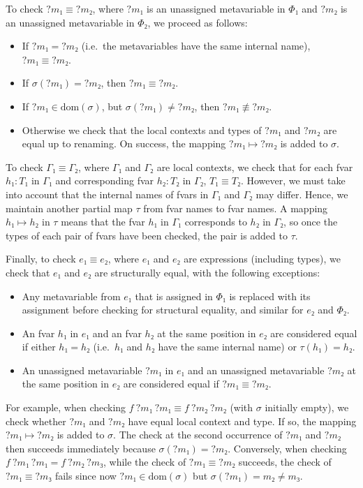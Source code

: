\documentclass[sigplan,10pt,anonymous,review]{acmart}
\newcommand{\mvar}[1]{{?#1}}
\newcommand{\dom}{\ensuremath{\mathrm{dom}}}
\begin{document}
To check $\mvar{m₁} ≡ \mvar{m₂}$, where $\mvar{m₁}$ is an unassigned metavariable in $Φ₁$ and $\mvar{m₂}$ is an unassigned metavariable in $Φ₂$, we proceed as follows:
\begin{itemize}
  \item If $\mvar{m₁} = \mvar{m₂}$ (i.e.\ the metavariables have the same internal name), $\mvar{m₁} ≡ \mvar{m₂}$.
  \item If $σ(\mvar{m₁}) = \mvar{m₂}$, then $\mvar{m₁} ≡ \mvar{m₂}$.
  \item If $\mvar{m₁} ∈ \dom(σ)$, but $σ(\mvar{m₁}) ≠ \mvar{m₂}$, then $\mvar{m₁} ≢ \mvar{m₂}$.
  \item Otherwise we check that the local contexts and types of $\mvar{m₁}$ and $\mvar{m₂}$ are equal up to renaming.
        On success, the mapping $\mvar{m₁} ↦ \mvar{m₂}$ is added to $σ$.
\end{itemize}

To check $Γ₁ ≡ Γ₂$, where $Γ₁$ and $Γ₂$ are local contexts, we check that for each fvar $h₁ : T₁$ in $Γ₁$ and corresponding fvar $h₂ : T₂$ in $Γ₂$, $T₁ ≡ T₂$.
However, we must take into account that the internal names of fvars in $Γ₁$ and $Γ₂$ may differ.
Hence, we maintain another partial map $τ$ from fvar names to fvar names.
A mapping $h₁ ↦ h₂$ in $τ$ means that the fvar $h₁$ in $Γ₁$ corresponds to $h₂$ in $Γ₂$, so once the types of each pair of fvars have been checked, the pair is added to $τ$.

Finally, to check $e₁ ≡ e₂$, where $e₁$ and $e₂$ are expressions (including types), we check that $e₁$ and $e₂$ are structurally equal, with the following exceptions:
\begin{itemize}
  \item Any metavariable from $e₁$ that is assigned in $Φ₁$ is replaced with its assignment before checking for structural equality, and similar for $e₂$ and $Φ₂$.
  \item An fvar $h₁$ in $e₁$ and an fvar $h₂$ at the same position in $e₂$ are considered equal if either $h₁ = h₂$ (i.e.\ $h₁$ and $h₂$ have the same internal name) or $τ(h₁) = h₂$.
  \item An unassigned metavariable $\mvar{m₁}$ in $e₁$ and an unassigned metavariable $\mvar{m₂}$ at the same position in $e₂$ are considered equal if $\mvar{m₁} ≡ \mvar{m₂}$.
\end{itemize}

For example, when checking $f~\mvar{m₁}~\mvar{m₁} ≡ f~\mvar{m₂}~\mvar{m₂}$ (with $σ$ initially empty), we check whether $\mvar{m₁}$ and $\mvar{m₂}$ have equal local context and type.
If so, the mapping $\mvar{m₁} ↦ \mvar{m₂}$ is added to $σ$.
The check at the second occurrence of $\mvar{m₁}$ and $\mvar{m₂}$ then succeeds immediately because $σ(\mvar{m₁}) = \mvar{m₂}$.
Conversely, when checking $f~\mvar{m₁}~\mvar{m₁} = f~\mvar{m₂}~\mvar{m₃}$, while the check of $\mvar{m₁} ≡ \mvar{m₂}$ succeeds, the check of $\mvar{m₁} ≡ \mvar{m₃}$ fails since now $\mvar{m₁} ∈ \dom(σ)$ but $σ(\mvar{m₁}) = m₂ ≠ m₃$.
\end{document}
